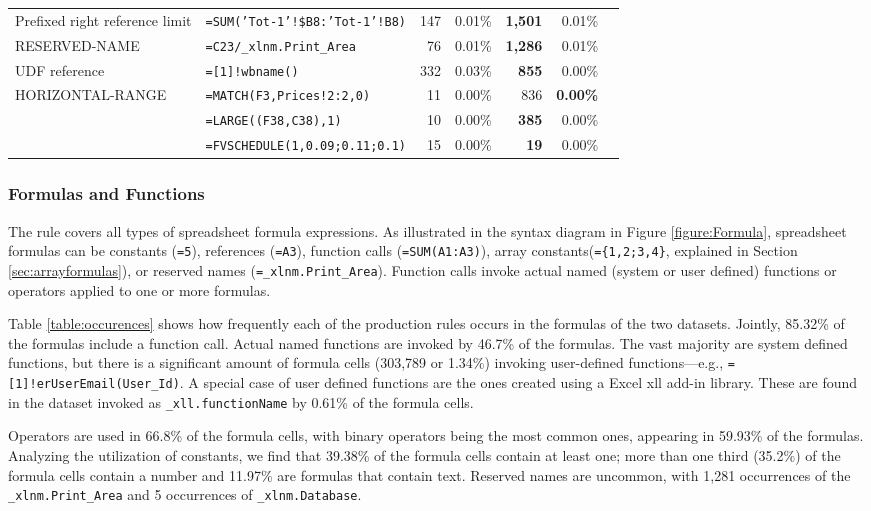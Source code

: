 \documentclass[conference]{IEEEtran}
\begin{document}
\begin{table}
\begin{tabular}{llrrrrr}
			Prefixed right reference limit & \texttt{=SUM('Tot-1'!\$B8:'Tot-1'!B8)}  & 147 & 0.01\% & \textbf{1,501} & 0.01\%\\
			RESERVED-NAME & \texttt{=C23/_xlnm.Print_Area}  & 76 & 0.01\% &\textbf{1,286} & 0.01\%\\
			UDF reference & \texttt{=[1]!wbname()}  & 332 & 0.03\% & \textbf{855} & 0.00\%\\
			HORIZONTAL-RANGE & \texttt{=MATCH(F3,Prices!2:2,0)}  & 11 & 0.00\% & 836 & \textbf{0.00\%}\\
			\synt{Union} & \texttt{=LARGE((F38,C38),1)}  & 10 & 0.00\% & \textbf{385} & 0.00\%\\
			\synt{ConstantArray} & \texttt{=FVSCHEDULE(1,{0.09;0.11;0.1})}  & 15 & 0.00\% & \textbf{19} & 0.00\%\\
			\hline
	\end{tabular}
\end{table}

\subsubsection{Formulas and Functions}

The  rule covers all types of spreadsheet formula expressions. As illustrated in the syntax diagram in Figure \ref{figure:Formula}, spreadsheet formulas can be constants (\texttt{=5}), references (\texttt{=A3}), function calls (\texttt{=SUM(A1:A3)}), array constants(\texttt{=\{1,2;3,4\}}, explained in Section \ref{sec:arrayformulas}), or reserved names (\texttt{=_xlnm.Print_Area}). Function calls invoke actual named (system or user defined) functions or operators applied to one or more formulas.

Table \ref{table:occurences} shows how frequently each of the production rules occurs in the formulas of the two datasets. Jointly, 85.32\% of the formulas include a function call. Actual named functions are invoked by 46.7\% of the formulas. The vast majority are system defined functions, but there is a significant amount of formula cells (303,789 or 1.34\%) invoking user-defined functions---e.g., \texttt{=[1]!erUserEmail(User_Id)}. A special case of user defined functions are the ones created using a Excel xll add-in library. These are found in the dataset invoked as \texttt{_xll.functionName} by 0.61\% of the formula cells.

Operators are used in 66.8\% of the formula cells, with binary operators being the most common ones, appearing in 59.93\% of the formulas. Analyzing the utilization of constants, we find that 39.38\% of the formula cells contain at least one; more than one third (35.2\%) of the formula cells contain a number and 11.97\% are formulas that contain text. Reserved names are uncommon, with 1,281 occurrences of the \texttt{_xlnm.Print_Area} and 5 occurrences of \texttt{_xlnm.Database}.
\end{document}
